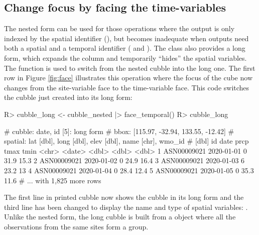\documentclass[
]{jss}
\begin{document}
\hypertarget{change-focus-by-facing-the-time-variables}{%
\subsection{Change focus by facing the time-variables}\label{change-focus-by-facing-the-time-variables}}

The nested form can be used for those operations where the output is only indexed by the spatial identifier (), but becomes inadequate when outputs need both a spatial and a temporal identifier ( and ). The  class also provides a long form, which expands the  column and temporarily ``hides'' the spatial variables. The function  is used to switch from the nested cubble into the long one. The first row in Figure \ref{fig:face} illustrates this operation where the focus of the cube now changes from the site-variable face to the time-variable face. This code switches the cubble just created into its long form:

\begin{CodeChunk}
\begin{CodeInput}
R> cubble_long <- cubble_nested |> face_temporal()
R> cubble_long
\end{CodeInput}
\begin{CodeOutput}
# cubble:  date, id [5]: long form
# bbox:    [115.97, -32.94, 133.55, -12.42]
# spatial: lat [dbl], long [dbl], elev [dbl], name [chr], wmo_id
#   [dbl]
  id          date        prcp  tmax  tmin
  <chr>       <date>     <dbl> <dbl> <dbl>
1 ASN00009021 2020-01-01     0  31.9  15.3
2 ASN00009021 2020-01-02     0  24.9  16.4
3 ASN00009021 2020-01-03     6  23.2  13  
4 ASN00009021 2020-01-04     0  28.4  12.4
5 ASN00009021 2020-01-05     0  35.3  11.6
# ... with 1,825 more rows
\end{CodeOutput}
\end{CodeChunk}

The first line in printed cubble now shows the cubble in its long form and the third line has been changed to display the name and type of spatial variables: . Unlike the nested form, the long cubble is built from a  object where all the observations from the same sites form a group.
\end{document}
